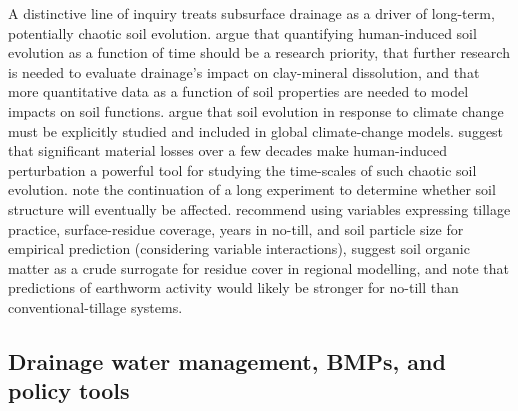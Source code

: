A distinctive line of inquiry treats subsurface drainage as a driver of long-term, potentially chaotic soil evolution. \textcite{Montagne2009} argue that quantifying human-induced soil evolution as a function of time should be a research priority, that further research is needed to evaluate drainage's impact on clay-mineral dissolution, and that more quantitative data as a function of soil properties are needed to model impacts on soil functions. \textcite{Montagne2010} argue that soil evolution in response to climate change must be explicitly studied and included in global climate-change models. \textcite{Montagne2013} suggest that significant material losses over a few decades make human-induced perturbation a powerful tool for studying the time-scales of such chaotic soil evolution. \textcite{HOOGHOUDT1952} note the continuation of a long experiment to determine whether soil structure will eventually be affected. \textcite{Ouellet2008} recommend using variables expressing tillage practice, surface-residue coverage, years in no-till, and soil particle size for empirical prediction (considering variable interactions), suggest soil organic matter as a crude surrogate for residue cover in regional modelling, and note that predictions of earthworm activity would likely be stronger for no-till than conventional-tillage systems.

\subsection{Drainage water management, BMPs, and policy tools}

